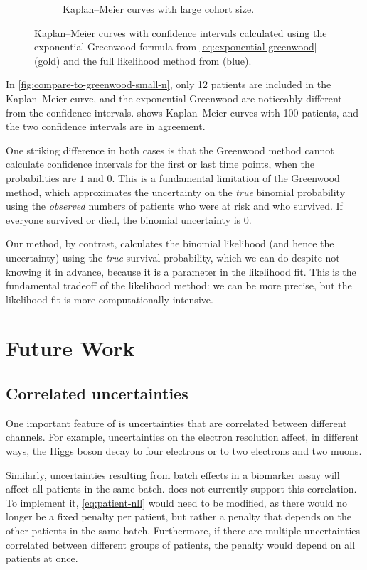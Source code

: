 \documentclass[article]{jss}
\newcommand{\KM}{Kaplan--Meier} %
\begin{document}
\begin{figure}
\begin{subfigure}[t]{0.49\textwidth}
  \caption{\label{fig:compare-to-greenwood-large-n} \KM{} curves with large cohort size.}
\end{subfigure}
\caption{\label{fig:compare-to-greenwood} \KM{} curves with confidence intervals calculated using the exponential Greenwood formula from \cref{eq:exponential-greenwood} (gold) and the full likelihood method from  (blue).}
\end{figure}

In \cref{fig:compare-to-greenwood-small-n}, only 12 patients are included in the \KM{} curve, and the exponential Greenwood are noticeably different from the  confidence intervals.   shows \KM{} curves with 100 patients, and the two confidence intervals are in agreement.

One striking difference in both cases is that the Greenwood method cannot calculate confidence intervals for the first or last time points, when the probabilities are \(1\) and \(0\).  This is a fundamental limitation of the Greenwood method, which approximates the uncertainty on the \emph{true} binomial probability using the \emph{observed} numbers of patients who were at risk and who survived.  If everyone survived or died, the binomial uncertainty is \(0\).

Our method, by contrast, calculates the binomial likelihood (and hence the uncertainty) using the \emph{true} survival probability, which we can do despite not knowing it in advance, because it is a parameter in the likelihood fit.  This is the fundamental tradeoff of the likelihood method: we can be more precise, but the likelihood fit is more computationally intensive.

\section{Future Work}

\subsection{Correlated uncertainties}

One important feature of  is uncertainties that are correlated between different channels.  For example, uncertainties on the electron resolution affect, in different ways, the Higgs boson decay to four electrons or to two electrons and two muons.

Similarly, uncertainties resulting from batch effects in a biomarker assay will affect all patients in the same batch\@.   does not currently support this correlation.  To implement it, \cref{eq:patient-nll} would need to be modified, as there would no longer be a fixed penalty per patient, but rather a penalty that depends on the other patients in the same batch.  Furthermore, if there are multiple uncertainties correlated between different groups of patients, the penalty would depend on all patients at once.
\end{document}
